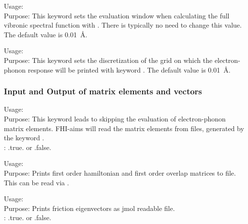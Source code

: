  {
\noindent
Usage:  \\
Purpose: This keyword sets the evaluation window when calculating the full vibronic spectral function with . There is typically no need to change this value. The default value is 0.01~\AA. \\
}

 {
\noindent
Usage:  \\
Purpose: This keyword sets the discretization of the grid on which the electron-phonon response will be printed with keyword . The default value is 0.01~\AA. \\
}



\subsubsection{Input and Output of matrix elements and vectors}

 {
\noindent
Usage:  \\
Purpose: This keyword leads to skipping the evaluation of electron-phonon matrix elements. FHI-aims will read the matrix elements from files, generated by the keyword .\\
: .true. or .false.\\
}

 {
\noindent
Usage: \\
Purpose: Prints first order hamiltonian and first order overlap matrices to file. This can be read via . \\
}

 {
\noindent
Usage: \\
Purpose: Prints friction eigenvectors as jmol readable file. \\
: .true. or .false.\\
}


